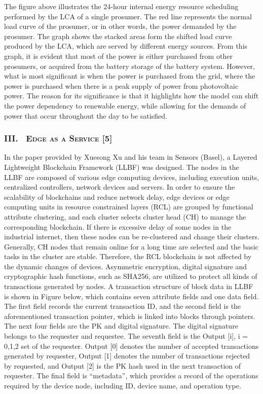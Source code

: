 \documentclass[
]{article}
\begin{document}
The figure above illustrates the 24-hour internal energy resource
scheduling performed by the LCA of a single prosumer. The red line
represents the normal load curve of the prosumer, or in other words, the
power demanded by the prosumer. The graph shows the stacked areas form
the shifted load curve produced by the LCA, which are served by
different energy sources. From this graph, it is evident that most of
the power is either purchased from other prosumers, or acquired from the
battery storage of the battery system. However, what is most significant
is when the power is purchased from the grid, where the power is
purchased when there is a peak supply of power from photovoltaic power.
The reason for its significance is that it highlights how the model can
shift the power dependency to renewable energy, while allowing for the
demands of power that occur throughout the day to be satisfied.

\hypertarget{iii.-edge-as-a-service-5}{%
\subsubsection{\texorpdfstring{III.~ \textsc{Edge as a Service
{[}5{]}}}{III.~ Edge as a Service {[}5{]}}}\label{iii.-edge-as-a-service-5}}

In the paper provided by Xuesong Xu and his team in Sensors (Basel), a
Layered Lightweight Blockchain Framework (LLBF) was designed. The nodes
in the LLBF are composed of various edge computing devices, including
execution units, centralized controllers, network devices and servers.
In order to ensure the scalability of blockchains and reduce network
delay, edge devices or edge computing units in resource constrained
layers (RCL) are grouped by functional attribute clustering, and each
cluster selects cluster head (CH) to manage the corresponding
blockchain. If there is excessive delay of some nodes in the industrial
internet, then these nodes can be re-clustered and change their
clusters. Generally, CH nodes that remain online for a long time are
selected and the basic tasks in the cluster are stable. Therefore, the
RCL blockchain is not affected by the dynamic changes of devices.
Asymmetric encryption, digital signature and cryptographic hash
functions, such as SHA256, are utilized to protect all kinds of
transactions generated by nodes. A transaction structure of block data
in LLBF is shown in Figure below, which contains seven attribute fields
and one data field. The first field records the current transaction ID,
and the second field is the aforementioned transaction pointer, which is
linked into blocks through pointers. The next four fields are the PK and
digital signature. The digital signature belongs to the requester and
requestee. The seventh field is the Output {[}i{]}, i = 0,1,2 set of the
requester. Output {[}0{]} denotes the number of accepted transactions
generated by requester, Output {[}1{]} denotes the number of
transactions rejected by requested, and Output {[}2{]} is the PK hash
used in the next transaction of requester. The final field is
``metadata'', which provides a record of the operations required by the
device node, including ID, device name, and operation type.
\end{document}
